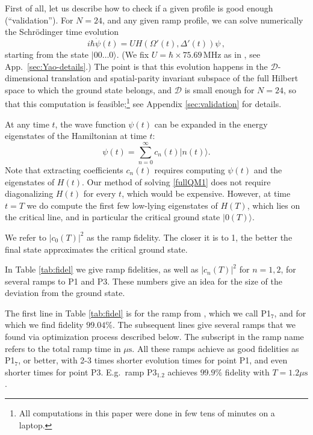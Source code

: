 \documentclass[a4paper,11pt]{article}
\theoremstyle{remark}
\theoremstyle{theorem}
\begin{document}
First of all, let us describe how to check if a given profile is good enough (``validation''). For $N=24$, and any given ramp profile, we can solve numerically the Schr\"odinger time evolution
\begin{equation}
	i \hbar \dot{\psi} (t) = U H (\Omega' (t), \Delta' (t)) \psi\,, \label{fullQM1}
\end{equation}
starting from the state $| 00 \ldots 0 \rangle$. (We fix $U = \hbar \times
75.69\,\text{MHz}$ as in {\cite{Fang:2024uyf}}, see App.~\ref{sec:Yao-details}.) The point is that this evolution happens in the $\mathcal{D}$-dimensional translation and
spatial-parity invariant subspace of the full Hilbert space to which the ground state belongs, and $\mathcal{D}$ is small enough for $N=24$, so that this computation is feasible;\footnote{All computations in this paper were done in few tens of minutes on a laptop.} see Appendix \ref{sec:validation} for details. 

At any time $t$, the wave function $\psi (t)$ can be expanded in the energy eigenstates of the Hamiltonian at time
$t$:
\begin{equation}
	\psi (t) = \sum_{n = 0}^{\infty} c_n (t)  | n (t)  \rangle .
	\label{eq:psiexp12}
\end{equation}
Note that extracting coefficients $c_n (t)$ requires computing $\psi(t)$ and the eigenstates of $H(t)$. Our method of solving \eqref{fullQM1} does not require diagonalizing $H(t)$ for every $t$, which would be expensive. However, at time $t=T$ we do compute the first few low-lying eigenstates of $H(T)$, which lies on the critical line, and in particular the critical ground state $|0(T)\rangle$.

We refer to $| c_0 (T) |^2$ as the ramp fidelity. The closer it is to 1, the
better the final state approximates the critical ground state. 

In Table \ref{tab:fidel} we give ramp fidelities, as well as $| c_n (T) |^2$ for $n=1,2$, for several ramps to P1 and P3. These numbers give an idea for the size of the deviation from the ground state. 

The first line in Table \ref{tab:fidel} is for the ramp from \cite{Fang:2024uyf}, which we call P1$_{7}$, and for which we find fidelity $99.04\%$. The subsequent lines give several ramps that we found via optimization process described below. The subscript in the ramp name refers to the total ramp time in $\mu{\text{s}}$. All these ramps achieve as good fidelities as P1$_7$, or better, with 2-3 times shorter evolution times for point P1,
and even shorter times for point P3. E.g.~ramp P3$_{1.2}$ achieves $99.9\%$ fidelity with $T=1.2 \mu\text{s}$.
\end{document}
